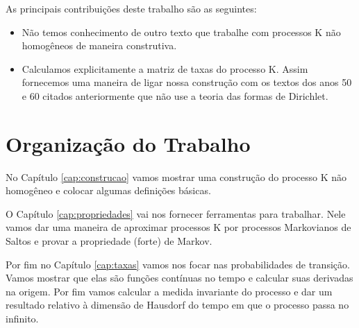 As principais contribuições deste trabalho são as seguintes:

\begin{itemize}

\item Não temos conhecimento de outro texto que trabalhe com processos
  K não homogêneos de maneira construtiva.

\item Calculamos explicitamente a matriz de taxas do processo K. Assim
  fornecemos uma maneira de ligar nossa construção com os textos dos
  anos 50 e 60 citados anteriormente que não use a teoria das formas
  de Dirichlet.

\end{itemize}

\section{Organização do Trabalho}
\label{sec:organizacao_trabalho}

No Capítulo \ref{cap:construcao} vamos mostrar uma construção do
processo K não homogêneo e colocar algumas definições básicas.

O Capítulo \ref{cap:propriedades} vai nos fornecer ferramentas para
trabalhar. Nele vamos dar uma maneira de aproximar processos K por
processos Markovianos de Saltos e provar a propriedade (forte) de
Markov.

Por fim no Capítulo \ref{cap:taxas} vamos nos focar nas probabilidades
de transição. Vamos mostrar que elas são funções contínuas no tempo e
calcular suas derivadas na origem. Por fim vamos calcular a medida
invariante do processo e dar um resultado relativo à dimensão de
Hausdorf do tempo em que o processo passa no infinito.


